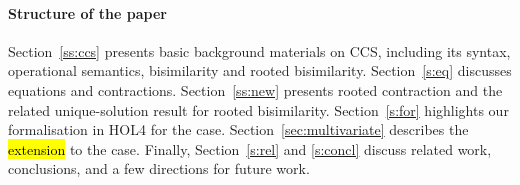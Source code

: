 \paragraph{Structure of the paper}

Section~\ref{ss:ccs} presents basic background materials on CCS,
including its syntax, operational semantics, bisimilarity and rooted
bisimilarity.
Section~\ref{s:eq} discusses equations and contractions.
Section~\ref{ss:new} presents rooted contraction and the related
unique-solution result for rooted bisimilarity.
Section~\ref{s:for} highlights our formalisation in HOL4 for the
\univariate case.
Section~\ref{sec:multivariate} describes the \hl{extension} to the
  \multivariate case.
Finally,  Section~\ref{s:rel} and \ref{s:concl} discuss related work,
conclusions, and a few directions for future work.

